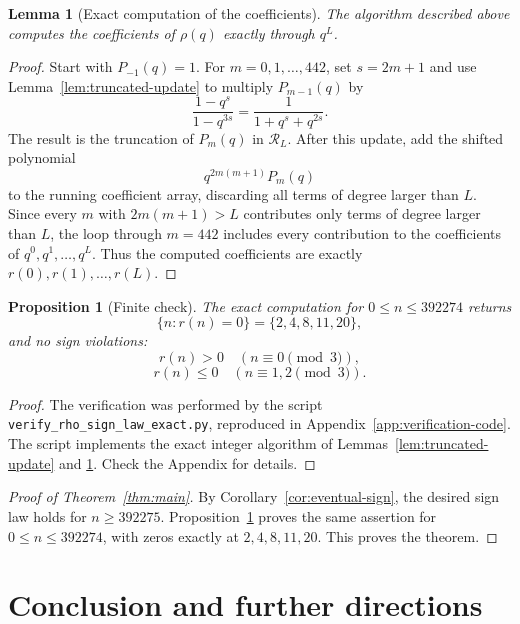 \documentclass[10pt,a4paper]{amsart}
\newtheorem{proposition}[theorem]{Proposition}
\newtheorem{lemma}[theorem]{Lemma}
\begin{document}
\begin{lemma}[Exact computation of the coefficients]\label{lem:exact-coeff-algorithm}
The algorithm described above computes the coefficients of $\rho(q)$ exactly
through $q^L$.
\end{lemma}

\begin{proof}
Start with $P_{-1}(q)=1$.  For $m=0,1,\ldots,442$, set $s=2m+1$ and use
Lemma~\ref{lem:truncated-update} to multiply $P_{m-1}(q)$ by
\[
\frac{1-q^s}{1-q^{3s}}
=\frac1{1+q^s+q^{2s}}.
\]
The result is the truncation of $P_m(q)$ in $\mathcal R_L$.  After this update,
add the shifted polynomial
\[
q^{2m(m+1)}P_m(q)
\]
to the running coefficient array, discarding all terms of degree larger than
$L$.  Since every $m$ with $2m(m+1)>L$ contributes only terms of degree larger
than $L$, the loop through $m=442$ includes every contribution to the
coefficients of $q^0,q^1,\ldots,q^L$.  Thus the computed coefficients are
exactly $r(0),r(1),\ldots,r(L)$.
\end{proof}

\begin{proposition}[Finite check]\label{prop:finite-check}
The exact computation for $0\leq n\leq392274$ returns
\[
\{n:r(n)=0\}=\{2,4,8,11,20\},
\]
and no sign violations:
\[
r(n)>0\quad(n\equiv0\pmod3),
\]
\[
r(n)\leq0\quad(n\equiv1,2\pmod3).
\]
\end{proposition}

\begin{proof}
The verification was performed by the script
\texttt{verify\_rho\_sign\_law\_exact.py}, reproduced in
Appendix~\ref{app:verification-code}.  The script implements the exact integer
algorithm of Lemmas~\ref{lem:truncated-update} and
\ref{lem:exact-coeff-algorithm}. 
Check the Appendix for details.

\end{proof}


\begin{proof}[Proof of Theorem~\ref{thm:main}]
By Corollary~\ref{cor:eventual-sign}, the desired sign law holds for
$n\geq392275$.  Proposition~\ref{prop:finite-check} proves the same assertion
for $0\leq n\leq392274$, with zeros exactly at $2,4,8,11,20$.  This proves the
theorem.
\end{proof}



\section{Conclusion and further directions}\label{sec:conclusion}
\end{document}
